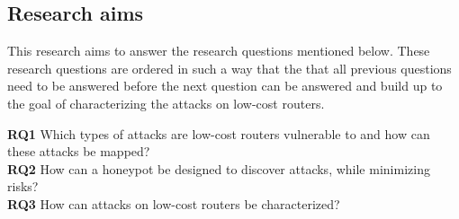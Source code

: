 \subsection{Research aims}
This research aims to answer the research questions mentioned below. These research questions are ordered in such a way that the that all previous questions need to be answered before the next question can be answered and build up to the goal of characterizing the attacks on low-cost routers.

\textbf{RQ1} Which types of attacks are low-cost routers vulnerable to and how can these attacks be mapped? \\
\textbf{RQ2} How can a honeypot be designed to discover attacks, while minimizing risks? \\
\textbf{RQ3} How can attacks on low-cost routers be characterized?